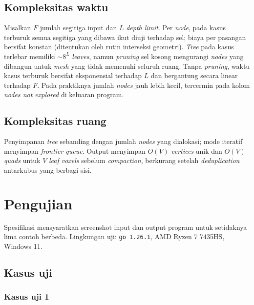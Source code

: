 \documentclass[11pt,a4paper]{article}
\begin{document}
\subsection{Kompleksitas waktu}

Misalkan $F$ jumlah segitiga input dan $L$ \textit{depth limit}. Per \textit{node}, pada kasus terburuk semua segitiga yang dibawa ikut diuji terhadap sel; biaya per pasangan bersifat konstan (ditentukan oleh rutin interseksi geometri). \textit{Tree} pada kasus terlebar memiliki $\sim8^L$ \textit{leaves}, namun \textit{pruning} sel kosong mengurangi \textit{nodes} yang dibangun untuk \textit{mesh} yang tidak memenuhi seluruh ruang. Tanpa \textit{pruning}, waktu kasus terburuk bersifat eksponensial terhadap $L$ dan bergantung secara linear terhadap $F$. Pada praktiknya jumlah \textit{nodes} jauh lebih kecil, tercermin pada kolom \textit{nodes not explored} di keluaran program.

\subsection{Kompleksitas ruang}

Penyimpanan \textit{tree} sebanding dengan jumlah \textit{nodes} yang dialokasi; mode iteratif menyimpan \textit{frontier queue}. Output menyimpan $O(V)$ \textit{vertices} unik dan $O(V)$ \textit{quads} untuk $V$ \textit{leaf voxels} sebelum \textit{compaction}, berkurang setelah \textit{deduplication} antarkubus yang berbagi sisi.

\section{Pengujian}

Spesifikasi mensyaratkan screenshot input dan output program untuk setidaknya lima contoh berbeda. Lingkungan uji: \texttt{go 1.26.1}, AMD Ryzen 7 7435HS, Windows 11.

\subsection{Kasus uji}

\subsubsection{Kasus uji 1}
\end{document}
